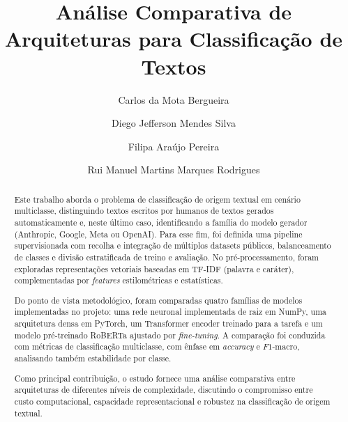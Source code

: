 \documentclass[runningheads]{llncs}
\begin{document}
%
\title{Análise Comparativa de Arquiteturas para Classificação de Textos}
%
%
\author{Carlos da Mota Bergueira \and
Diego Jefferson Mendes Silva \and
Filipa Araújo Pereira \and
Rui Manuel Martins Marques Rodrigues}
%
%
%
\maketitle              %
%
\begin{abstract}
Este trabalho aborda o problema de classificação de origem textual em cenário multiclasse, distinguindo textos escritos por humanos de textos gerados automaticamente e, neste último caso, identificando a família do modelo gerador (Anthropic, Google, Meta ou OpenAI). Para esse fim, foi definida uma pipeline supervisionada com recolha e integração de múltiplos datasets públicos, balanceamento de classes e divisão estratificada de treino e avaliação. No pré-processamento, foram exploradas representações vetoriais baseadas em TF-IDF (palavra e caráter), complementadas por \textit{features} estilométricas e estatísticas.

Do ponto de vista metodológico, foram comparadas quatro famílias de modelos implementadas no projeto: uma rede neuronal implementada de raiz em NumPy, uma arquitetura densa em PyTorch, um Transformer encoder treinado para a tarefa e um modelo pré-treinado RoBERTa ajustado por \textit{fine-tuning}. A comparação foi conduzida com métricas de classificação multiclasse, com ênfase em \textit{accuracy} e \(F1\)-macro, analisando também estabilidade por classe.

Como principal contribuição, o estudo fornece uma análise comparativa entre arquiteturas de diferentes níveis de complexidade, discutindo o compromisso entre custo computacional, capacidade representacional e robustez na classificação de origem textual.

\end{abstract}
\end{document}
